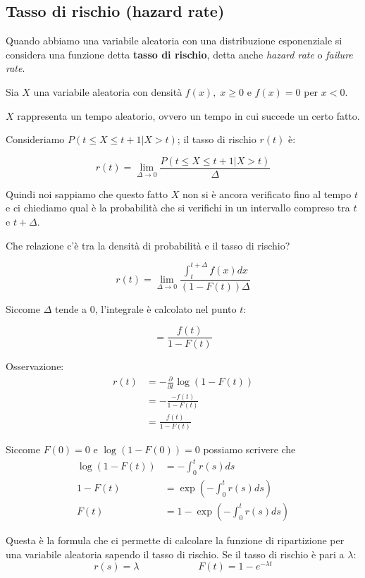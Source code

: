 \documentclass[a4paper,12pt]{book}
\begin{document}
\subsection{Tasso di rischio (hazard rate)} %
Quando abbiamo una variabile aleatoria con una distribuzione esponenziale si considera una funzione detta \textbf{tasso di rischio}, detta anche \textit{hazard rate} o \textit{failure rate}. 

Sia $ X $ una variabile aleatoria con densità $ f(x), \; x \ge 0 $ e $ f(x) = 0 $ per $ x < 0 $.

$ X $ rappresenta un tempo aleatorio, ovvero un tempo in cui succede un certo fatto. 

Consideriamo $ P(t \le X \le t+1 | X > t) $; il tasso di rischio $ r(t) $ è:

$$ r(t) = \lim\limits_{\Delta \to 0} \frac{P(t \le X \le t+1 | X > t)}{\Delta}$$ 

Quindi noi sappiamo che questo fatto $ X $ non si è ancora verificato fino al tempo $ t $ e ci chiediamo qual è la probabilità che si verifichi in un intervallo compreso tra $ t $ e $ t + \Delta $.

Che relazione c'è tra la densità di probabilità e il tasso di rischio?

$$ r(t) = \lim\limits_{\Delta \to 0} \frac{\int_{t}^{t + \Delta} f(x)dx }{(1 - F(t))\Delta}$$ 

Siccome $\Delta$ tende a 0, l'integrale è calcolato nel punto $ t $:

$$ = \frac{f(t)}{1 - F(t)} $$

Osservazione:
\begin{align*}
	r(t) & = -\frac{\partial}{\partial t} \log (1 - F(t)) \\
	& = - \frac{-f(t)}{1 - F(t)} \\
	& = \frac{f(t)}{1 - F(t)}
\end{align*}

Siccome $ F(0) = 0 $ e $ \log(1 - F(0)) = 0 $ possiamo scrivere che 
\begin{align*}
	\log(1 - F(t)) & = -\int_{0}^{t} r(s) ds \\
	1 - F(t) & = \exp \left( - \int_{0}^{t} r(s)ds \right) \\
	F(t) & = 1 - \exp \left( - \int_{0}^{t} r(s)ds \right)
\end{align*}

Questa è la formula che ci permette di calcolare la funzione di ripartizione per una variabile aleatoria sapendo il tasso di rischio. Se il tasso di rischio è pari a $\lambda$:
$$ r(s) = \lambda \qquad \qquad \qquad F(t) = 1 - e^{-\lambda t}$$ 
\end{document}
